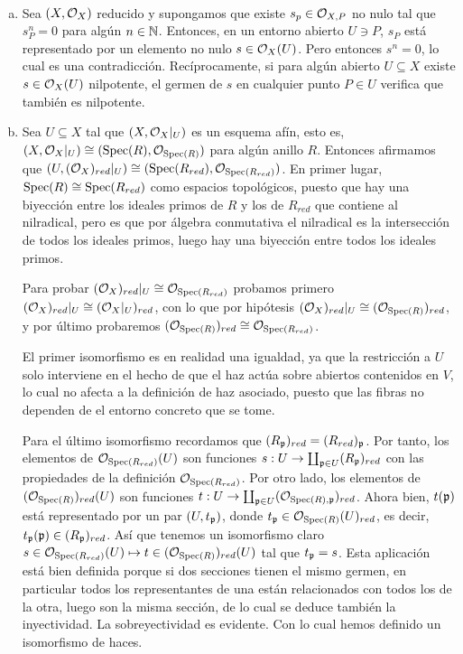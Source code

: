 \documentclass[twoside]{article}
\begin{document}
\begin{solucion}\
\begin{enumerate}[(a)]
\item Sea $(X,{\mathcal O}_X)$ reducido y supongamos que existe $s_p\in {\mathcal O}_{X,P}$ no nulo tal que $s^n_P=0$ para algún $n\in\mathbb{N}$. Entonces, en un entorno abierto $U\ni P$, $s_P$ está representado por un elemento no nulo $s\in{\mathcal O}_X(U)$. Pero entonces $s^n=0$, lo cual es una contradicción. Recíprocamente, si para algún abierto $U\subseteq X$ existe $s\in {\mathcal O}_X(U)$ nilpotente, el germen de $s$ en cualquier punto $P\in U$ verifica que también es nilpotente. 

\item Sea $U\subseteq X$ tal que $(X,{\mathcal O}_X|_{U})$ es un esquema afín, esto es, $(X,{\mathcal O}_X|_{U})\cong (\operatorname{Spec}(R),{\mathcal O}_{\operatorname{Spec}(R)})$ para algún anillo $R$. Entonces afirmamos que $(U, ({\mathcal O}_X)_{red}|_{U})\cong (\operatorname{Spec}(R_{red}), {\mathcal O}_{\operatorname{Spec}(R_{red})})$. En primer lugar, $\operatorname{Spec}(R)\cong\operatorname{Spec}(R_{red})$ como espacios topológicos, puesto que hay una biyección entre los ideales primos de $R$ y los de $R_{red}$ que contiene al nilradical, pero es que por álgebra conmutativa el nilradical es la intersección de todos los ideales primos, luego hay una biyección entre todos los ideales primos. 

Para probar $({\mathcal O}_X)_{red}|_{U}\cong {\mathcal O}_{\operatorname{Spec}(R_{red})}$ probamos primero  $({\mathcal O}_X)_{red}|_{U}\cong({\mathcal O}_X|_{U})_{red}$, con lo que por hipótesis $({\mathcal O}_X)_{red}|_{U}\cong ({\mathcal O}_{\operatorname{Spec}(R)})_{red}$, y por último probaremos $({\mathcal O}_{\operatorname{Spec}(R)})_{red}\cong {\mathcal O}_{\operatorname{Spec}(R_{red})}$. 

El primer isomorfismo es en realidad una igualdad, ya que la restricción a $U$ solo interviene en el hecho de que el haz actúa sobre abiertos contenidos en $V$, lo cual no afecta a la definición de haz asociado, puesto que las fibras no dependen de el entorno concreto que se tome. 

Para el último isomorfismo recordamos que $(R_{\mathfrak{p}})_{red}=(R_{red})_{\mathfrak{p}}$. Por tanto, los elementos de ${\mathcal O}_{\operatorname{Spec}(R_{red})}(U)$ son funciones $s:U\to\coprod_{\mathfrak{p}\in U}(R_{\mathfrak{p}})_{red}$ con las propiedades de la definición ${\mathcal O}_{\operatorname{Spec}(R_{red})}$. Por otro lado, los elementos de $({\mathcal O}_{\operatorname{Spec}(R)})_{red}(U)$ son funciones $t:U\to \coprod_{\mathfrak{p}\in U}({\mathcal O}_{\operatorname{Spec}(R),\mathfrak{p}})_{red}$. Ahora bien, $t(\mathfrak{p})$ está representado por un par $(U, t_{\mathfrak{p}})$, donde $t_{\mathfrak{p}}\in {\mathcal O}_{\operatorname{Spec}(R)}(U)_{red}$, es decir, $t_{\mathfrak{p}}(\mathfrak{p})\in (R_{\mathfrak{p}})_{red}$. Así que tenemos un isomorfismo claro $s\in {\mathcal O}_{\operatorname{Spec}(R_{red})}(U)\mapsto t\in ({\mathcal O}_{\operatorname{Spec}(R)})_{red}(U)$ tal que $t_{\mathfrak{p}}=s$. Esta aplicación está bien definida porque si dos secciones tienen el mismo germen, en particular todos los representantes de una están relacionados con todos los de la otra, luego son la misma sección, de lo cual se deduce también la inyectividad. La sobreyectividad es evidente. Con lo cual hemos definido un isomorfismo de haces. 


\end{enumerate}
\end{solucion}
\end{document}
